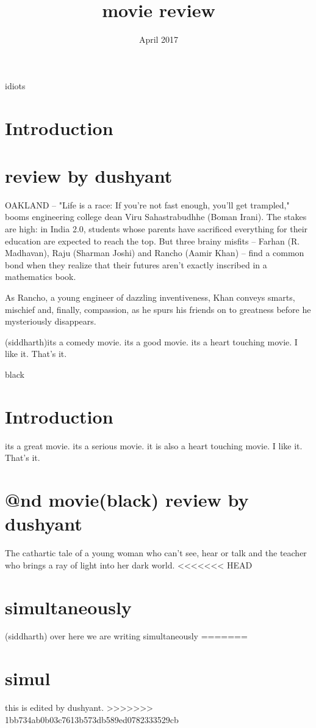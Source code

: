 \documentclass{article}
\title{movie review}
\date{April 2017}
\begin{document}
 idiots
\section{Introduction}

\section{review by dushyant}
OAKLAND -- "Life is a race: If you're not fast enough, you'll get trampled," booms engineering college dean Viru Sahastrabudhhe (Boman Irani). The stakes are high: in India 2.0, students whose parents have sacrificed everything for their education are expected to reach the top. But three brainy misfits -- Farhan (R. Madhavan), Raju (Sharman Joshi) and Rancho (Aamir Khan) -- find a common bond when they realize that their futures aren't exactly inscribed in a mathematics book.

As Rancho, a young engineer of dazzling inventiveness, Khan conveys smarts, mischief and, finally, compassion, as he spurs his friends on to greatness before he mysteriously disappears.


(siddharth)its a comedy movie. its a good movie. its a heart touching movie. I like it. That's it.  


\maketitle
black
\section{Introduction}
its a great movie. its a serious movie. it is also a heart touching movie. I like it. That's it.

\section{@nd movie(black) review by dushyant}
The cathartic tale of a young woman who can't see, hear or talk and the teacher who brings a ray of light into her dark world.
<<<<<<< HEAD


\section{simultaneously}
(siddharth) over here we are writing simultaneously
=======
\section{simul}
this is edited by dushyant. 
>>>>>>> 1bb734ab0b03c7613b573db589ed0782333529cb
\end{document}
